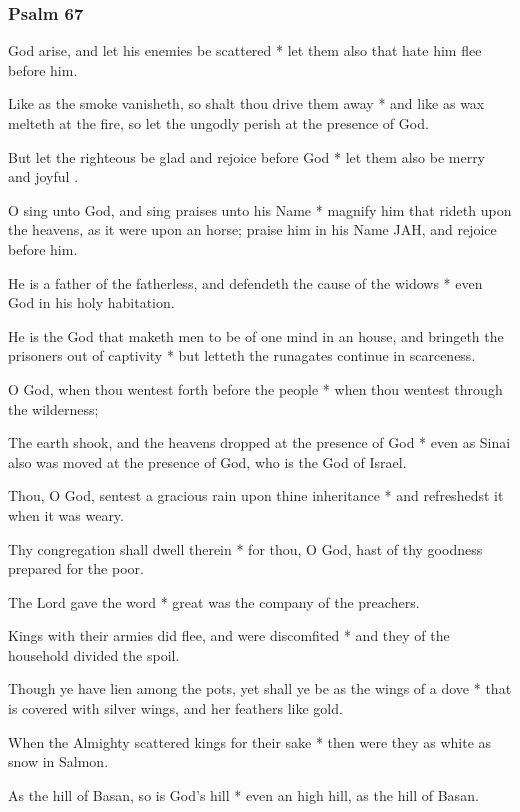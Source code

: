 \subsubsection{Psalm 67}


 God arise, and let his enemies be scattered * let them also that hate him flee before him.

Like as the smoke vanisheth, so shalt thou drive them away * and like as wax melteth at the fire, so let the ungodly perish at the presence of God.

But let the righteous be glad and rejoice before God * let them also be merry and joyful .

O sing unto God, and sing praises unto his Name * magnify him that rideth upon the heavens, as it were upon an horse; praise him in his Name \textsc{JAH}, and rejoice before him.

He is a father of the fatherless, and defendeth the cause of the widows * even God in his holy habitation.

He is the God that maketh men to be of one mind in an house, and bringeth the prisoners out of captivity * but letteth the runagates continue in scarceness.

O God, when thou wentest forth before the people * when thou wentest through the wilderness;

The earth shook, and the heavens dropped at the presence of God * even as Sinai also was moved at the presence of God, who is the God of Israel.

Thou, O God, sentest a gracious rain upon thine inheritance * and refreshedst it when it was weary.

Thy congregation shall dwell therein * for thou, O God, hast of thy goodness prepared for the poor.

The Lord gave the word * great was the company of the preachers.

Kings with their armies did flee, and were discomfited * and they of the household divided the spoil.

Though ye have lien among the pots, yet shall ye be as the wings of a dove * that is covered with silver wings, and her feathers like gold.

When the Almighty scattered kings for their sake * then were they as white as snow in Salmon.

As the hill of Basan, so is God's hill * even an high hill, as the hill of Basan.

